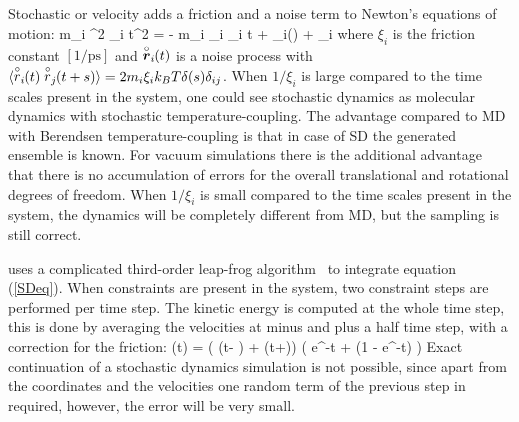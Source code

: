 \section{}
\label{sec:SD}
Stochastic or velocity  adds a friction
and a noise term to Newton's equations of motion:
\beq
\label{SDeq}
m_i {\de^2 _i \over \de t^2} =
- m_i \xi_i {\de {}_i \over \de t} + _i() + \vrond_i
\eeq 
where $\xi_i$ is the friction constant $[1/\mbox{ps}]$ and
$\stackrel{\circ}{\mbox{\boldmath ${r}$}}_i\!\!(t)$  is a noise process with 
$\langle \stackrel{\circ}{r}_i\!\!(t) \stackrel{\circ}{r}_j\!\!(t+s) \rangle = 
    2 m_i \xi_i k_B T \delta(s) \delta_{ij}$.
When $1/\xi_i$ is large compared to the time scales present in the system,
one could see stochastic dynamics as molecular dynamics with stochastic
temperature-coupling. The advantage compared to MD with Berendsen
temperature-coupling is that in case of SD the generated ensemble is known.
For vacuum simulations there is the additional advantage that there is no
accumulation of errors for the overall translational and rotational
degrees of freedom.
When $1/\xi_i$ is small compared to the time scales present in the system,
the dynamics will be completely different from MD, but the sampling is
still correct.

{\gromacs} uses a complicated third-order leap-frog
algorithm~\cite{Gunsteren88} to integrate equation (\ref{SDeq}).
When constraints are present in the system,
two constraint steps are performed per time step.
The kinetic energy is computed at the whole time step, this is done by
averaging the velocities at minus and plus a half time step,
with a correction for the friction:
\beq
{}(t) =  \left(  \left(t- \right) 
                + \left(t+\right)\right)
\left( e^{-\xi\Delta t} + \left(1 - e^{-\xi\Delta t}\right) \right)
\eeq
Exact continuation of a stochastic dynamics simulation is not possible,
since apart from the coordinates and the velocities one random term of the
previous step in required, however, the error will be very small.

